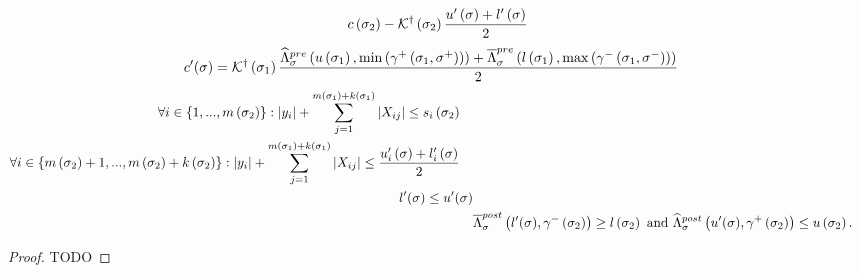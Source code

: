 \begin{lemma}
\begin{align}
\begin{split}
c\left(\sigma_{2}\right) - \mathcal{K}^\dagger\left(\sigma_{2}\right)\frac{u^\prime\left(\sigma\right)+l^\prime\left(\sigma\right)}{2}\\
\end{split}
\end{align}
\begin{align}
\begin{split}
& c^\prime(\sigma) = \mathcal{K}^\dagger\left(\sigma_{1}\right)\frac{\widehat{\Lambda}_{\sigma}^{pre}\left(u\left(\sigma_{1}\right),\min\left(\gamma^+\left(\sigma_{1},\sigma^+\right)\right)\right)+
\overline{\Lambda}_{\sigma}^{pre}\left(l\left(\sigma_{1}\right),\max\left(\gamma^-\left(\sigma_{1},\sigma^-\right)\right)\right)}{2}
\end{split}
\end{align}
\begin{align}
\begin{split}
& \forall i\in \{1,...,m\left(\sigma_{2}\right)\}:
 \left|y_i\right|+\sum_{j=1}^{m\left(\sigma_{1}\right)+k\left(\sigma_{1}\right)}\left|X_{ij}\right|\leq s_i\left(\sigma_{2}\right)
\end{split}\\
\begin{split}
& \forall i\in
\left\{m\left(\sigma_{2}\right)+1,...,m\left(\sigma_{2}\right)+k\left(\sigma_{2}\right)\right\}:
\left|y_i\right|+\sum_{j=1}^{m\left(\sigma_{1}\right)+k\left(\sigma_{1}\right)}\left|X_{ij}\right|\leq \frac{u^\prime_i\left(\sigma\right)+l^\prime_i\left(\sigma\right)}{2}
\end{split}\\
\begin{split}
l^\prime(\sigma)\leq u^\prime(\sigma)
\end{split}\\
& \overline{\Lambda}_{\sigma}^{post}\left(l^\prime(\sigma),\gamma^-\left(\sigma_{2}\right)\right)\geq
l\left(\sigma_{2}\right)~\text{and}~\widehat{\Lambda}_{\sigma}^{post}\left(u^\prime(\sigma),\gamma^+\left(\sigma_{2}\right)\right)\leq u\left(\sigma_{2}\right).
\end{align}
\end{lemma}
\begin{proof}
{\color{red} TODO}
\end{proof}

